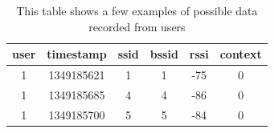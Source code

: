 \begin{table}[h] \centering
\begin{tabular}{cccccc}
\hline
\multicolumn{1}{l}{\textbf{user}} & \multicolumn{1}{l}{\textbf{timestamp}} & \multicolumn{1}{l}{\textbf{ssid}} & \multicolumn{1}{l}{\textbf{bssid}} & \multicolumn{1}{l}{\textbf{rssi}} & \multicolumn{1}{l}{\textbf{context}} \\ \hline
1                                 & 1349185621                             & 1                                 & 1                                  & -75                               & 0                                    \\
1                                 & 1349185685                             & 4                                 & 4                                  & -86                               & 0                                    \\
1                                 & 1349185700                             & 5                                 & 5                                  & -84                               & 0                                    \\ \hline
\end{tabular}
\caption{This table shows a few examples of possible data recorded from users}
\label{tab:user_data}
\end{table}

